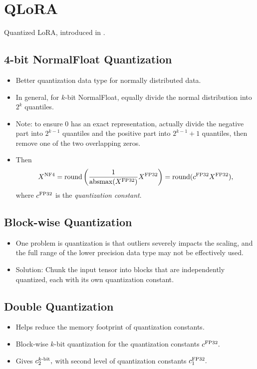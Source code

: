 \section{QLoRA}
Quantized LoRA, introduced in \cite{qlora}.

\subsection{4-bit NormalFloat Quantization}

\begin{itemize}
    \item Better quantization data type for normally distributed data.
    \item In general, for $k$-bit NormalFloat, equally divide the normal distribution into $2^k$ quantiles.
    \item Note: to ensure $0$ has an exact representation, actually divide the negative part into $2^{k-1}$ quantiles and the positive part into $2^{k-1} + 1$ quantiles, then remove one of the two overlapping zeros.
    \item Then
    \begin{equation*}
        X^{\mathrm{NF} 4} = \operatorname{round}\left(\frac{1}{\operatorname{absmax}(X^{\mathrm{FP} 32})} X^{\mathrm{FP} 32}\right) = \operatorname{round}(c^{\mathrm{FP} 32}X^{\mathrm{FP} 32}),
    \end{equation*}
    where $c^{\mathrm{FP} 32}$ is the \textit{quantization constant}.
\end{itemize}

\subsection{Block-wise Quantization}
\begin{itemize}
    \item One problem is quantization is that outliers severely impacts the scaling, and the full range of the lower precision data type may not be effectively used.
    \item Solution: Chunk the input tensor into blocks that are independently quantized, each with its own quantization constant.
\end{itemize}

\subsection{Double Quantization}
\begin{itemize}
    \item Helps reduce the memory footprint of quantization constants.
    \item Block-wise $k$-bit quantization for the quantization constants $c^{\mathrm{FP} 32}.$
    \item Gives $c^{k\text{-bit}}_2,$ with second level of quantization constants $c_1^{\mathrm{FP} 32}.$
\end{itemize}

